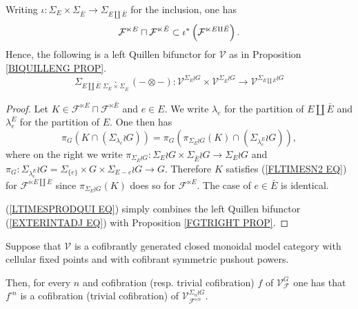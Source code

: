 \documentclass[a4paper,10pt]{article}%
\begin{document}
\begin{proposition}\label{LTIMESPRODINC PROP}
	Writing 
	$\iota \colon \Sigma_E \times \Sigma_{\bar{E}} \to
	\Sigma_{E \amalg \bar{E}}$ for the inclusion, one has 
\[
	\mathcal{F}^{\ltimes E}
		\sqcap
	\mathcal{F}^{\ltimes \bar{E}}
		\subset
	\iota^{\**}\left(\mathcal{F}^{\ltimes E \amalg \bar{E}}\right).
\]
	Hence, the following is a left Quillen bifunctor for $\mathcal V$ as in Proposition \ref{BIQUILLENG PROP}.
\begin{equation}\label{LTIMESPRODQUI EQ}
	\Sigma_{E \amalg \bar{E}} 
	\underset{\Sigma_E \times \Sigma_{\bar{E}}}{\cdot}
	(\minus \otimes \minus)
		\colon
	\mathcal{V}^{\Sigma_E \wr G}
		\times
	\mathcal{V}^{\Sigma_{\bar{E}} \wr G}
		\to
	\mathcal{V}^{\Sigma_{E \amalg \bar{E}} \wr G}
\end{equation}
\end{proposition}


\begin{proof}
	Let 
	$K \in 
	\mathcal{F}^{\ltimes E}
		\sqcap
	\mathcal{F}^{\ltimes \bar{E}}	
	$
	and $e \in E$. 
	We write $\lambda_e$ for the partition of $E \amalg \bar{E}$
	and $\lambda_e^E$ for the partition of $E$.
	One then has
\[
\pi_G
\left(
	K \cap \left( \Sigma_{\lambda_e} \wr G \right) \right)
	=
\pi_G
\left(
	\pi_{\Sigma_E \wr G}(K)
	\cap \left( \Sigma_{\lambda_e^E} \wr G \right)
\right),
\]
where on the right we write
$\pi_{\Sigma_E \wr G} \colon
\Sigma_E \wr G \times \Sigma_{\bar{E}} \wr G
\to 
\Sigma_E \wr G$
and 
$\pi_G \colon \Sigma_{\lambda^E_e} \wr G
=\Sigma_{\{e\}} \times G \times \Sigma_{E-e} \wr G
\to G$. Therefore $K$ 
satisfies (\ref{FLTIMESN2 EQ}) for 
$\mathcal{F}^{\ltimes E \amalg \bar{E}}$
since 
$\pi_{\Sigma_E \wr G}(K)$ does so for 
$\mathcal{F}^{\ltimes E}$.
The case of $e \in \bar{E}$ is identical.

(\ref{LTIMESPRODQUI EQ}) simply combines 
the left Quillen bifunctor
(\ref{EXTERINTADJ EQ}) with 
Proposition \ref{FGTRIGHT PROP}.
\end{proof}


\begin{proposition}\label{POWERF PROP}
	Suppose that $\mathcal{V}$ is a cofibrantly generated closed monoidal model category with cellular fixed points and with cofibrant symmetric pushout powers.
	
	Then, for every $n$ and cofibration (resp. trivial cofibration) $f$ of $\mathcal{V}^{G}_{\mathcal{F}}$
	one has that $f^{\square n}$ is a cofibration (trivial cofibration) of $\mathcal{V}^{\Sigma_n \wr G}_{\mathcal{F}^{\ltimes n}}$.
\end{proposition}
\end{document}
